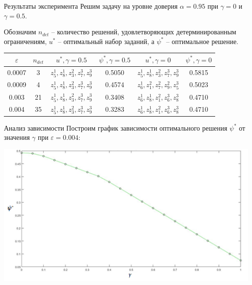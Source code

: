 \documentclass[aspectratio=169]{beamer}
\begin{document}
    \begin{frame}{Результаты эксперимента}
        Решим задачу на уровне доверия $\alpha=0.95$ при $\gamma=0$ и $\gamma=0.5$.\newline
        
        Обозначим $n_{det}$ -- количество решений, удовлетворяющих детерминированным ограничениям, $u^*$ -- оптимальный набор заданий, а $\psi^*$ -- оптимальное решение.
       	
       	\begin{table}[]
\begin{tabular}{|c|c|c|c|c|c|}
\hline
$\varepsilon$ & $n_{det}$ & $u^*,\gamma=0.5$ & $\psi^*,\gamma=0.5$ & $u^*,\gamma=0$ & $\psi^*,\gamma=0$ \\ \hline
0.0007 & 3 & $z_5^1,z_8^1,z_3^2,z_7^3,z_9^3$ & 0.5050 & $z_5^1,z_8^1,z_3^2,z_7^3,z_9^3$ & 0.5815 \\ \hline
0.0009 & 4 & $z_5^1,z_8^1,z_3^2,z_7^3,z_9^3$ & 0.4574 & $z_6^1,z_1^2,z_7^2,z_9^2,z_5^3$ & 0.5023 \\ \hline
0.003 & 21 & $z_5^1,z_8^1,z_3^2,z_7^3,z_9^3$ & 0.3408 & $z_6^1,z_8^1,z_1^2,z_6^3,z_8^3$ & 0.4710 \\ \hline
0.004 & 35 & $z_5^1,z_8^1,z_3^2,z_7^3,z_9^3$ & 0.3283 & $z_6^1,z_8^1,z_1^2,z_6^3,z_8^3$ & 0.4710 \\ \hline
\end{tabular}
\end{table}
    \end{frame}
    
    \begin{frame}{Анализ зависимости}
        Построим график зависимости оптимального решения $\psi^*$ от значения $\gamma$ при $\varepsilon=0.004$:
        
        \begin{center}
        \includegraphics[scale=0.6]{plot}
        \end{center}
    \end{frame}
    
\end{document}
